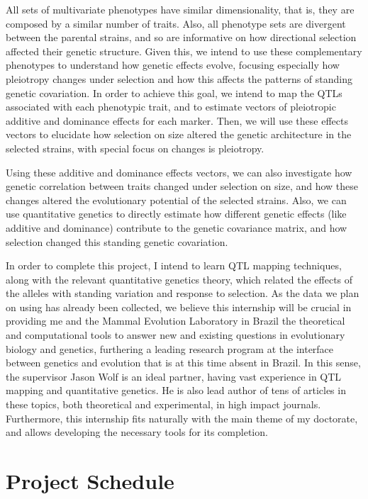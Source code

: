 \documentclass[twoside,a4paper,12pt]{article}
\begin{document}
All sets of multivariate phenotypes have similar dimensionality, that
is, they are composed by a similar number of traits. Also, all phenotype
sets are divergent between the parental strains, and so are informative
on how directional selection affected their genetic structure. Given
this, we intend to use these complementary phenotypes to understand
how genetic effects evolve, focusing especially how pleiotropy changes
under selection and how this affects the patterns of standing genetic
covariation. In order to achieve this goal, we intend to map the QTLs
associated with each phenotypic trait, and to estimate vectors of
pleiotropic additive and dominance effects for each marker. Then, we will
use these effects vectors to elucidate how selection on size altered
the genetic architecture in the selected strains, with special focus on
changes is pleiotropy.

Using these additive and dominance effects vectors, we can also
investigate how genetic correlation between traits changed under
selection on size, and how these changes altered the evolutionary
potential of the selected strains. Also, we can use quantitative
genetics to directly estimate how different genetic effects (like
additive and dominance) contribute to the genetic covariance matrix, and
how selection changed this standing genetic covariation.

In order to complete this project, I intend to learn QTL mapping
techniques, along with the relevant quantitative genetics theory,
which related the effects of the alleles with standing variation
and response to selection. As the data we plan on using has already
been collected, we believe this internship will be crucial in providing
me and the Mammal Evolution Laboratory in Brazil the theoretical and
computational tools to answer new and existing questions in evolutionary
biology and genetics, furthering a leading research program at the
interface between genetics and evolution that is at this time absent in
Brazil. In this sense, the supervisor Jason Wolf is an ideal partner,
having vast experience in QTL mapping and quantitative genetics. He is
also lead author of tens of articles in these topics, both theoretical
and experimental, in high impact journals. Furthermore, this internship
fits naturally with the main theme of my doctorate, and allows developing
the necessary tools for its completion.

\section{Project Schedule}
\end{document}
